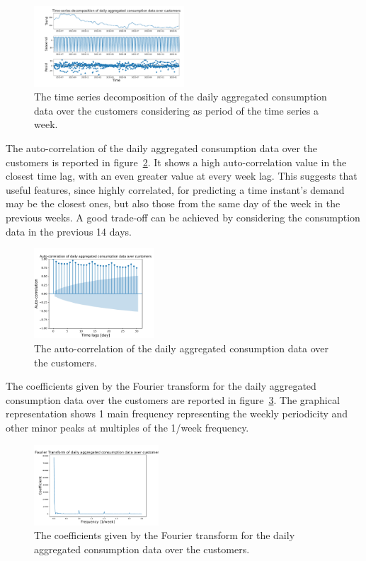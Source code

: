 \begin{figure}[H]
\centering
\includegraphics[width=0.5\textwidth]{images/demand/daily_aggregated_decomposition}
\caption{The time series decomposition of the daily aggregated consumption data over the customers considering as period of the time series a week.}
\label{fig:demanddecompositionday}
\end{figure}

The auto-correlation of the daily aggregated consumption data over the customers is reported in figure~\ref{fig:demandcorrelationday}.
It shows a high auto-correlation value in the closest time lag, with an even greater value at every week lag.
This suggests that useful features, since highly correlated, for predicting a time instant's demand may be the closest ones, but also those from the same day of the week in the previous weeks.
A good trade-off can be achieved by considering the consumption data in the previous 14 days.

\begin{figure}[H]
\centering
\includegraphics[width=0.4\textwidth]{images/demand/daily_aggregated_correlation}
\caption{The auto-correlation of the daily aggregated consumption data over the customers.}
\label{fig:demandcorrelationday}
\end{figure}

The coefficients given by the Fourier transform for the daily aggregated consumption data over the customers are reported in figure~\ref{fig:demandftday}.
The graphical representation shows 1 main frequency representing the weekly periodicity and other minor peaks at multiples of the 1/week frequency.

\begin{figure}[H]
\centering
\includegraphics[width=0.415\textwidth]{images/demand/ft_day}
\caption{The coefficients given by the Fourier transform for the daily aggregated consumption data over the customers.}
\label{fig:demandftday}
\end{figure}

